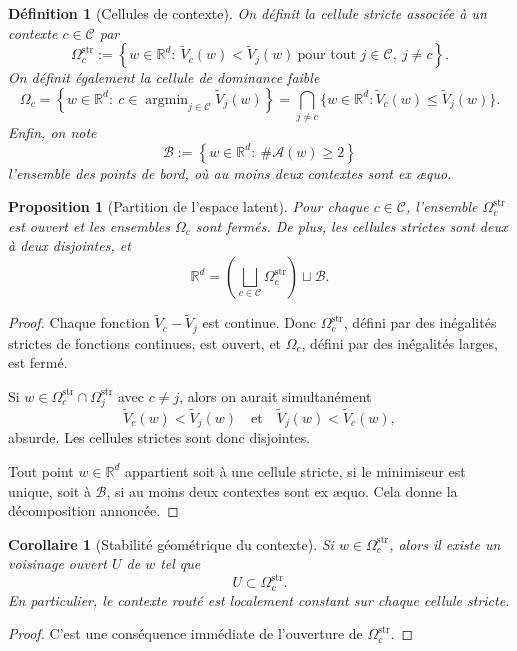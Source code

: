 \documentclass[11pt,a4paper]{article}
\newtheorem{definition}{Définition}[section]
\newtheorem{proposition}{Proposition}[section]
\newtheorem{corollary}{Corollaire}[section]
\DeclareMathOperator{\argmin}{argmin}
\newcommand{\R}{\mathbb R}
\newcommand{\Ccal}{\mathcal C}
\begin{document}
\begin{definition}[Cellules de contexte]
On définit la cellule stricte associée à un contexte \(c\in\Ccal\) par
\[
\Omega_c^{\mathrm{str}}
:=
\left\{
w\in\R^d:\ \widetilde V_c(w)<\widetilde V_j(w)\ \text{pour tout }j\in\Ccal,\ j\neq c
\right\}.
\]
On définit également la cellule de dominance faible
\[
\Omega_c
=
\left\{
w\in\R^d:\ c\in\argmin_{j\in\Ccal}\widetilde V_j(w)
\right\}
=
\bigcap_{j\neq c}\{w\in\R^d:\widetilde V_c(w)\le \widetilde V_j(w)\}.
\]
Enfin, on note
\[
\mathcal B
:=
\left\{
w\in\R^d:\ \#\mathcal A(w)\ge 2
\right\}
\]
l'ensemble des points de bord, où au moins deux contextes sont ex æquo.
\end{definition}

\begin{proposition}[Partition de l'espace latent]
Pour chaque \(c\in\Ccal\), l'ensemble \(\Omega_c^{\mathrm{str}}\) est ouvert et les ensembles \(\Omega_c\) sont fermés. De plus, les cellules strictes sont deux à deux disjointes, et
\[
\R^d
=
\left(\bigsqcup_{c\in\Ccal}\Omega_c^{\mathrm{str}}\right)\sqcup \mathcal B.
\]
\end{proposition}

\begin{proof}
Chaque fonction \(\widetilde V_c-\widetilde V_j\) est continue. Donc \(\Omega_c^{\mathrm{str}}\), défini par des inégalités strictes de fonctions continues, est ouvert, et \(\Omega_c\), défini par des inégalités larges, est fermé.

Si \(w\in\Omega_c^{\mathrm{str}}\cap\Omega_j^{\mathrm{str}}\) avec \(c\neq j\), alors on aurait simultanément
\[
\widetilde V_c(w)<\widetilde V_j(w)
\quad\text{et}\quad
\widetilde V_j(w)<\widetilde V_c(w),
\]
absurde. Les cellules strictes sont donc disjointes.

Tout point \(w\in\R^d\) appartient soit à une cellule stricte, si le minimiseur est unique, soit à \(\mathcal B\), si au moins deux contextes sont ex æquo. Cela donne la décomposition annoncée.
\end{proof}

\begin{corollary}[Stabilité géométrique du contexte]
Si \(w\in\Omega_c^{\mathrm{str}}\), alors il existe un voisinage ouvert \(U\) de \(w\) tel que
\[
U\subset \Omega_c^{\mathrm{str}}.
\]
En particulier, le contexte routé est localement constant sur chaque cellule stricte.
\end{corollary}

\begin{proof}
C'est une conséquence immédiate de l'ouverture de \(\Omega_c^{\mathrm{str}}\).
\end{proof}
\end{document}
